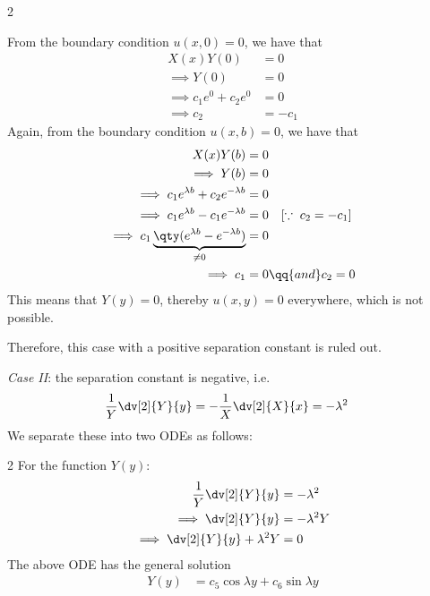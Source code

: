 \begin{enumerate}
\begin{multicols}{2}
            \end{multicols}
            From the boundary condition $u(x,0)=0$, we have that
            \begin{align*}
                X(x)Y(0)&=0 \\
                \implies Y(0)&=0 \\
                \implies c_1e^{0}+c_2e^{0}&=0 \\
                \implies c_2&=-c_1
            \end{align*}
            Again, from the boundary condition $u(x,b)=0$, we have that
            \begin{align*}
                X(x)Y(b)&=0 \\
                \implies Y(b)&=0 \\
                \implies c_1e^{\lambda b}+c_2e^{-\lambda b}&=0 \\
                \implies c_1e^{\lambda b}-c_1e^{-\lambda b}&=0\quad[\because\;c_2=-c_1] \\
                \implies c_1\underbrace{\qty(e^{\lambda b}-e^{-\lambda b})}_{\neq 0}&=0 \\
                \implies c_1&=0\qq{and}c_2=0
            \end{align*}
            This means that $Y(y)=0$, thereby $u(x,y)=0$ everywhere, which is not possible.

            Therefore, this case with a positive separation constant is ruled out.

            \textit{Case II}: the separation constant is negative, i.e.
            \begin{align*}
                \dfrac{1}{Y}\dv[2]{Y}{y}&=-\dfrac{1}{X}\dv[2]{X}{x}=-\lambda^2
            \end{align*}
            We separate these into two ODEs as follows:
            \begin{multicols}{2}
            \setlength{\columnseprule}{0.4pt}
                For the function $Y(y)$:
                \begin{align*}
                    \dfrac{1}{Y}\dv[2]{Y}{y}&=-\lambda^2 \\
                    \implies\dv[2]{Y}{y}&=-\lambda^2Y \\
                    \implies\dv[2]{Y}{y}+\lambda^2Y&=0
                \end{align*}
                The above ODE has the general solution
                \begin{align}
                    Y(y)&=c_5\cos{\lambda y}+c_6\sin{\lambda y} \label{eqn:lapl:eg-1:y-gen-soln-2}
                \end{align}
                

\end{multicols}
\end{enumerate}

